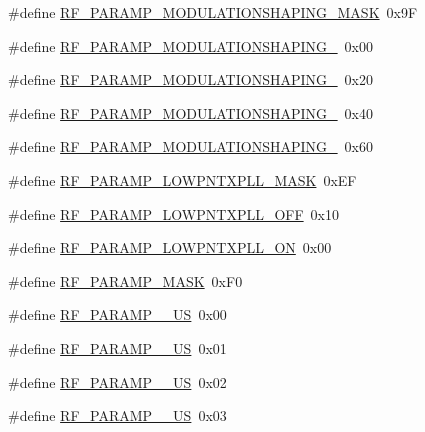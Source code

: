 \begin{DoxyCompactItemize}
\#define \mbox{\hyperlink{sx1276_regs-_fsk_8h_a2019a19e41c1a718452eb913fd9937d2}{R\+F\+\_\+\+P\+A\+R\+A\+M\+P\+\_\+\+M\+O\+D\+U\+L\+A\+T\+I\+O\+N\+S\+H\+A\+P\+I\+N\+G\+\_\+\+M\+A\+SK}}~0x9F
\item 
\#define \mbox{\hyperlink{sx1276_regs-_fsk_8h_a47d1468a141e8c1be9607da3cfc76603}{R\+F\+\_\+\+P\+A\+R\+A\+M\+P\+\_\+\+M\+O\+D\+U\+L\+A\+T\+I\+O\+N\+S\+H\+A\+P\+I\+N\+G\+\_}}~0x00
\item 
\#define \mbox{\hyperlink{sx1276_regs-_fsk_8h_af73d04396de25ed02028034df8c62a7e}{R\+F\+\_\+\+P\+A\+R\+A\+M\+P\+\_\+\+M\+O\+D\+U\+L\+A\+T\+I\+O\+N\+S\+H\+A\+P\+I\+N\+G\+\_}}~0x20
\item 
\#define \mbox{\hyperlink{sx1276_regs-_fsk_8h_aa4ea0dc5db5619e8e06345948cba2e67}{R\+F\+\_\+\+P\+A\+R\+A\+M\+P\+\_\+\+M\+O\+D\+U\+L\+A\+T\+I\+O\+N\+S\+H\+A\+P\+I\+N\+G\+\_}}~0x40
\item 
\#define \mbox{\hyperlink{sx1276_regs-_fsk_8h_a5b381c8b6905eb4a4ce79fef82b5d6df}{R\+F\+\_\+\+P\+A\+R\+A\+M\+P\+\_\+\+M\+O\+D\+U\+L\+A\+T\+I\+O\+N\+S\+H\+A\+P\+I\+N\+G\+\_}}~0x60
\item 
\#define \mbox{\hyperlink{sx1276_regs-_fsk_8h_a4821994144ee566eb3452c92c08d1801}{R\+F\+\_\+\+P\+A\+R\+A\+M\+P\+\_\+\+L\+O\+W\+P\+N\+T\+X\+P\+L\+L\+\_\+\+M\+A\+SK}}~0x\+EF
\item 
\#define \mbox{\hyperlink{sx1276_regs-_fsk_8h_a6ee4b65572eec82ea7473695aa118762}{R\+F\+\_\+\+P\+A\+R\+A\+M\+P\+\_\+\+L\+O\+W\+P\+N\+T\+X\+P\+L\+L\+\_\+\+O\+FF}}~0x10
\item 
\#define \mbox{\hyperlink{sx1276_regs-_fsk_8h_ab08c5cb0f135bcc77cb0d238467ce7b6}{R\+F\+\_\+\+P\+A\+R\+A\+M\+P\+\_\+\+L\+O\+W\+P\+N\+T\+X\+P\+L\+L\+\_\+\+ON}}~0x00
\item 
\#define \mbox{\hyperlink{sx1276_regs-_fsk_8h_acf298b5a57b53f2dbaabc1bf14b7e195}{R\+F\+\_\+\+P\+A\+R\+A\+M\+P\+\_\+\+M\+A\+SK}}~0x\+F0
\item 
\#define \mbox{\hyperlink{sx1276_regs-_fsk_8h_a7af19d4ba1da0302a8f0663928b03fb3}{R\+F\+\_\+\+P\+A\+R\+A\+M\+P\+\_\+\_\+\+US}}~0x00
\item 
\#define \mbox{\hyperlink{sx1276_regs-_fsk_8h_a19914e4184e2246e820f923f068b4a84}{R\+F\+\_\+\+P\+A\+R\+A\+M\+P\+\_\+\_\+\+US}}~0x01
\item 
\#define \mbox{\hyperlink{sx1276_regs-_fsk_8h_a8647a6bde6d158ce8a6209f0bcf939a5}{R\+F\+\_\+\+P\+A\+R\+A\+M\+P\+\_\+\_\+\+US}}~0x02
\item 
\#define \mbox{\hyperlink{sx1276_regs-_fsk_8h_a2b7aa0506166758344a48149bc647a19}{R\+F\+\_\+\+P\+A\+R\+A\+M\+P\+\_\+\_\+\+US}}~0x03

\end{DoxyCompactItemize}

